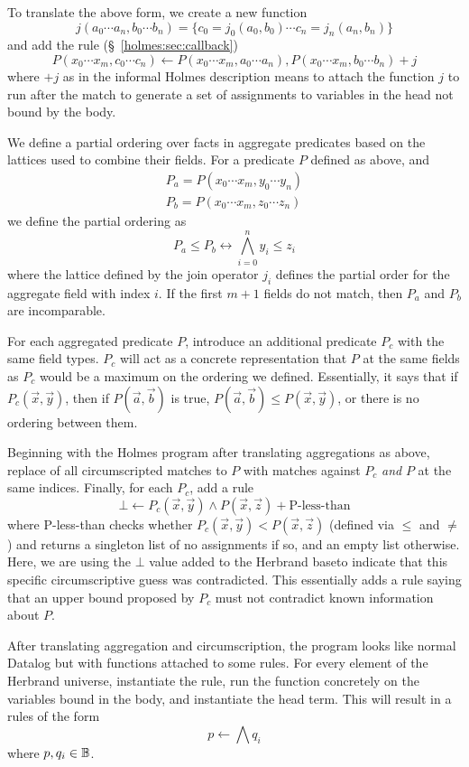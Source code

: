 To translate the above form, we create a new function
\[
	j(a_0 \cdots a_n, b_0 \cdots b_n) = \{c_0 = j_0(a_0, b_0) \cdots c_n = j_n(a_n, b_n)\}
\]
and add the rule (\S~\ref{holmes:sec:callback})
\[
	P(x_0 \cdots x_m, c_0 \cdots c_n) \leftarrow P(x_0 \cdots x_m, a_0 \cdots a_n), P(x_0 \cdots x_m, b_0 \cdots b_n) + j
\]
where $+ j$ as in the informal Holmes description means to attach the function $j$ to run after the match to generate a set of assignments to variables in the head not bound by the body.

We define a partial ordering over facts in aggregate predicates based on the lattices used to combine their fields.
For a predicate $P$ defined as above, and
\begin{align}
	P_a = P(x_0 \cdots x_m, y_0 \cdots y_n)\\
	P_b = P(x_0 \cdots x_m, z_0 \cdots z_n)
\end{align}
we define the partial ordering as
\[
	P_a \leq P_b \leftrightarrow \bigwedge_{i = 0}^n y_i \leq z_i
\]
where the lattice defined by the join operator $j_i$ defines the partial order for the  aggregate field with index $i$.
If the first $m + 1$ fields do not match, then $P_a$ and $P_b$ are incomparable.

For each aggregated predicate $P$, introduce an additional predicate $P_c$ with the same field types.
$P_c$ will act as a concrete representation that $P$ at the same fields as $P_c$ would be a maximum on the ordering we defined.
Essentially, it says that if $P_c(\vec{x}, \vec{y})$, then if $P(\vec{a}, \vec{b})$ is true, $P(\vec{a}, \vec{b}) \leq P(\vec{x}, \vec{y})$, or there is no ordering between them.

Beginning with the Holmes program after translating aggregations as above, replace of all circumscripted matches to $P$ with matches against $P_c$ \emph{and} $P$ at the same indices.
Finally, for each $P_c$, add a rule
\[
	\bot \leftarrow P_c(\vec{x}, \vec{y}) \wedge P(\vec{x}, \vec{z}) + \textrm{P-less-than}
\]
where P-less-than checks whether $P_c(\vec{x}, \vec{y}) < P(\vec{x}, \vec{z})$ (defined via $\leq$ and $\neq$) and returns a singleton list of no assignments if so, and an empty list otherwise.
Here, we are using the $\bot$ value added to the Herbrand baseto indicate that this specific circumscriptive guess was contradicted.
This essentially adds a rule saying that an upper bound proposed by $P_c$ must not contradict known information about $P$.

After translating aggregation and circumscription, the program looks like normal Datalog but with functions attached to some rules.
For every element of the Herbrand universe, instantiate the rule, run the function concretely on the variables bound in the body, and instantiate the head term.
This will result in a rules of the form
\[
	p \leftarrow \bigwedge q_i
\]
where $p, q_i \in \mathbb{B}$.

